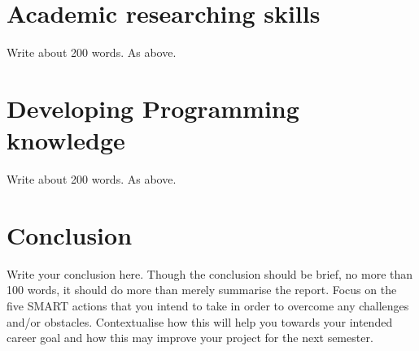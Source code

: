 \documentclass{scrartcl}
\begin{document}
\section{Academic researching skills}

Write about 200 words. As above.

\section{Developing Programming knowledge}

Write about 200 words. As above.


\section{Conclusion}

Write your conclusion here. Though the conclusion should be brief, no more than 100 words, it should do more than merely summarise the report. Focus on the five SMART actions that you intend to take in order to overcome any challenges and/or obstacles. Contextualise how this will help you towards your intended career goal and how this may improve your project for the next semester.



\end{document}
